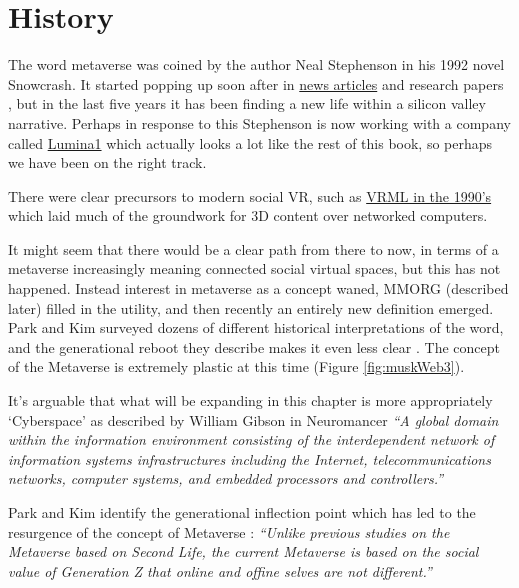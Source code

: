 \section{History}
The word metaverse was coined by the author Neal Stephenson in his 1992 novel Snowcrash. It started popping up soon after in \href{https://www.newscientist.com/article/mg14819994-000-how-to-build-a-metaverse/}{news articles} and research papers \cite{mclellan1993avatars}, but in the last five years it has been finding a new life within a silicon valley narrative. Perhaps in response to this Stephenson is now working with a company called \href{https://www.lamina1.com/}{Lumina1} which actually looks a lot like the rest of this book, so perhaps we have been on the right track.\par
There were clear precursors to modern social VR, such as \href{https://www.howtogeek.com/778554/remembering-vrml-the-metaverse-of-1995/}{VRML in the 1990's} which laid much of the groundwork for 3D content over networked computers.\par%
It might seem that there would be a clear path from there to now, in terms of a metaverse increasingly meaning connected social virtual spaces, but this has not happened. Instead interest in metaverse as a concept waned, MMORG (described later) filled in the utility, and then recently an entirely new definition emerged. Park and Kim surveyed dozens of different historical interpretations of the word, and the generational reboot they describe makes it even less clear \cite{park2022metaverse}. The concept of the Metaverse is extremely plastic at this time (Figure \ref{fig:muskWeb3}).\par
It's arguable that what will be expanding in this chapter is more appropriately `Cyberspace' as described by William Gibson in Neuromancer \cite{gibson2019neuromancer} \textit{``A global domain within the information environment consisting of the interdependent network of information systems infrastructures including the Internet, telecommunications networks, computer systems, and embedded processors and controllers.''}\par
Park and Kim identify the generational inflection point which has led to the resurgence of the concept of Metaverse \cite{park2022metaverse}: 
\textit{``Unlike previous studies on the Metaverse based on Second Life, the current Metaverse is based on the social value of Generation Z that online and offine selves are not different.''} \par

